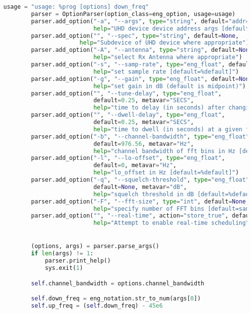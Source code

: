 \begin{lstlisting}[language=Python]
        usage = "usage: %prog [options] down_freq"
        parser = OptionParser(option_class=eng_option, usage=usage)
        parser.add_option("-a", "--args", type="string", default="addr=192.168.20.2",
                          help="UHD device device address args [default=%default]")
        parser.add_option("", "--spec", type="string", default=None,
                      help="Subdevice of UHD device where appropriate")
        parser.add_option("-A", "--antenna", type="string", default=None,
                          help="select Rx Antenna where appropriate")
        parser.add_option("-s", "--samp-rate", type="eng_float", default=1e6,
                          help="set sample rate [default=%default]")
        parser.add_option("-g", "--gain", type="eng_float", default=None,
                          help="set gain in dB (default is midpoint)")
        parser.add_option("", "--tune-delay", type="eng_float",
                          default=0.25, metavar="SECS",
                          help="time to delay (in seconds) after changing frequency [default=%default]")
        parser.add_option("", "--dwell-delay", type="eng_float",
                          default=0.25, metavar="SECS",
                          help="time to dwell (in seconds) at a given frequency [default=%default]")
        parser.add_option("-b", "--channel-bandwidth", type="eng_float",
                          default=976.56, metavar="Hz",
                          help="channel bandwidth of fft bins in Hz [default=%default]")
        parser.add_option("-l", "--lo-offset", type="eng_float",
                          default=0, metavar="Hz",
                          help="lo_offset in Hz [default=%default]")
        parser.add_option("-q", "--squelch-threshold", type="eng_float",
                          default=None, metavar="dB",
                          help="squelch threshold in dB [default=%default]")
        parser.add_option("-F", "--fft-size", type="int", default=None,
                          help="specify number of FFT bins [default=samp_rate/channel_bw]")
        parser.add_option("", "--real-time", action="store_true", default=False,
                          help="Attempt to enable real-time scheduling")


        (options, args) = parser.parse_args()
        if len(args) != 1:
            parser.print_help()
            sys.exit(1)

        self.channel_bandwidth = options.channel_bandwidth

        self.down_freq = eng_notation.str_to_num(args[0])
        self.up_freq = (self.down_freq) - 45e6




\end{lstlisting}

